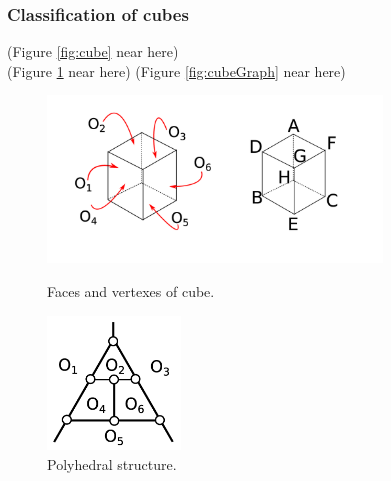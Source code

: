\documentclass[suppldata, dvipdfmx]{interact}
\theoremstyle{plain}%
\theoremstyle{definition}
\theoremstyle{remark}
\theoremstyle{problemstyle}
\begin{document}
\subsubsection{Classification of cubes}

\noindent(Figure \ref{fig:cube} near here)\\
(Figure \ref{fig:cubePolyhedralStructure} near here)
\noindent(Figure \ref{fig:cubeGraph}
 near here)

\begin{figure}[h!tbp]
  \begin{minipage}[t]{0.66\textwidth}
 \centering
 \includegraphics[width=3.5in,
 keepaspectratio]{./img/HexahedraWithSphericalFaces/cubes.jpg}
 \caption{Faces and vertexes of cube.}
 \label{fig:cube}
  \end{minipage}
 \hspace*{\fill}
  \begin{minipage}[t]{0.33\textwidth}
   \centering
   \includegraphics[width=1.4in, keepaspectratio]{./img/HexahedraWithSphericalFaces/cube/cubeFaces.jpg}
   \caption{Polyhedral structure.}
   \label{fig:cubePolyhedralStructure}
  \end{minipage}
\end{figure}
\end{document}
